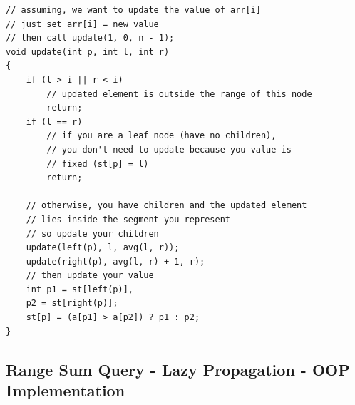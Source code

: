 \documentclass[12pt]{book}
\begin{document}
\begin{verbatim}
// assuming, we want to update the value of arr[i]
// just set arr[i] = new value
// then call update(1, 0, n - 1);
void update(int p, int l, int r)
{	
	if (l > i || r < i)
		// updated element is outside the range of this node
		return;
	if (l == r)
		// if you are a leaf node (have no children),
		// you don't need to update because you value is
		// fixed (st[p] = l)
		return;

	// otherwise, you have children and the updated element
	// lies inside the segment you represent
	// so update your children
	update(left(p), l, avg(l, r));
	update(right(p), avg(l, r) + 1, r);
	// then update your value
	int p1 = st[left(p)],
	p2 = st[right(p)];
	st[p] = (a[p1] > a[p2]) ? p1 : p2;
}
\end{verbatim}

\subsection{Range Sum Query - Lazy Propagation - OOP Implementation}
\end{document}
